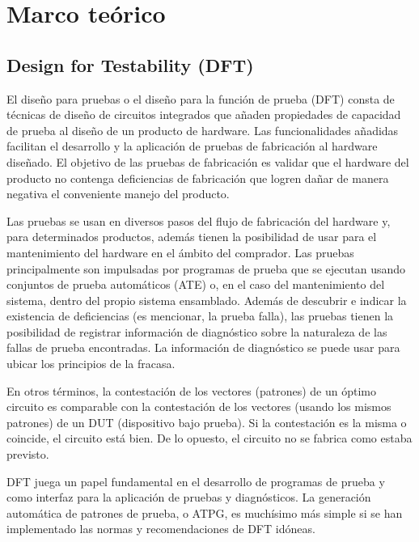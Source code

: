 \chapter{Marco teórico}
\label{ch:marco}


\section{Design for Testability (DFT)}

El diseño para pruebas o el diseño para la función de prueba (DFT) consta de técnicas de diseño de circuitos integrados que añaden propiedades de capacidad de prueba al diseño de un producto de hardware. Las funcionalidades añadidas facilitan el desarrollo y la aplicación de pruebas de fabricación  al hardware diseñado. El objetivo de las pruebas de fabricación  es validar que el hardware del producto no contenga deficiencias de fabricación  que logren dañar de manera negativa el conveniente manejo del producto.\cite{dft}\par

 Las pruebas se usan en diversos pasos del flujo de fabricación  del hardware y, para determinados productos, además tienen la posibilidad de usar para el mantenimiento del hardware en el ámbito del comprador. Las pruebas principalmente son impulsadas por programas de prueba que se ejecutan usando conjuntos de prueba automáticos (ATE) o, en el caso del mantenimiento del sistema, dentro del propio sistema ensamblado. Además de descubrir e indicar la existencia de deficiencias (es mencionar, la prueba falla), las pruebas tienen la posibilidad de registrar información de diagnóstico sobre la naturaleza de las fallas de prueba encontradas. La información de diagnóstico se puede usar para ubicar los principios de la fracasa.\cite{803123}\par

 En otros términos, la contestación de los vectores (patrones) de un óptimo circuito es comparable con la contestación de los vectores (usando los mismos patrones) de un DUT (dispositivo bajo prueba). Si la contestación es la misma o coincide, el circuito está bien. De lo opuesto, el circuito no se fabrica como estaba previsto.\par

 DFT juega un papel fundamental en el desarrollo de programas de prueba y como interfaz para la aplicación de pruebas y diagnósticos. La generación automática de patrones de prueba, o ATPG, es muchísimo más simple si se han implementado las normas y recomendaciones de DFT idóneas. \par

